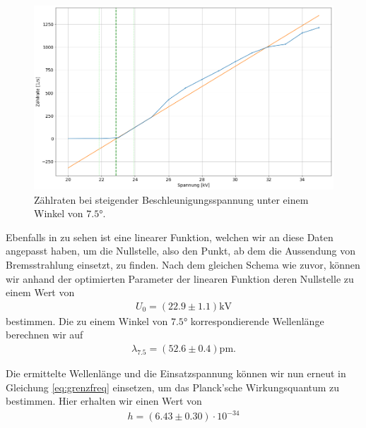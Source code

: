 \begin{figure}[H]
  \centering
  \includegraphics[width=.9\textwidth]{files/plots/lif_ang75_volt_fit.png}
  \caption{Zählraten bei steigender Beschleunigungsspannung unter einem Winkel von $7.5\si{\degree}$.}
  \label{fig:lif_ang75_volt_fit}
\end{figure}

Ebenfalls in  zu sehen ist eine linearer Funktion, welchen wir an diese Daten angepasst haben, um die Nullstelle, also den Punkt, ab dem die Aussendung von Bremsstrahlung einsetzt, zu finden. Nach dem gleichen Schema wie zuvor, können wir anhand der optimierten Parameter der linearen Funktion deren Nullstelle zu einem Wert von
\begin{align}
  U_0 = (22.9 \pm 1.1)\si{\kilo\volt}
\end{align}
bestimmen. Die zu einem Winkel von $7.5\si{\degree}$ korrespondierende Wellenlänge berechnen wir auf
\begin{align}
  \lambda_{7.5} = (52.6 \pm 0.4)\si{\pico\meter}.
\end{align}

Die ermittelte Wellenlänge und die Einsatzspannung können wir nun erneut in Gleichung \eqref{eq:grenzfreq} einsetzen, um das Planck'sche Wirkungsquantum zu bestimmen. Hier erhalten wir einen Wert von
\begin{align}
  h = (6.43 \pm 0.30) \cdot 10^{-34}
\end{align}